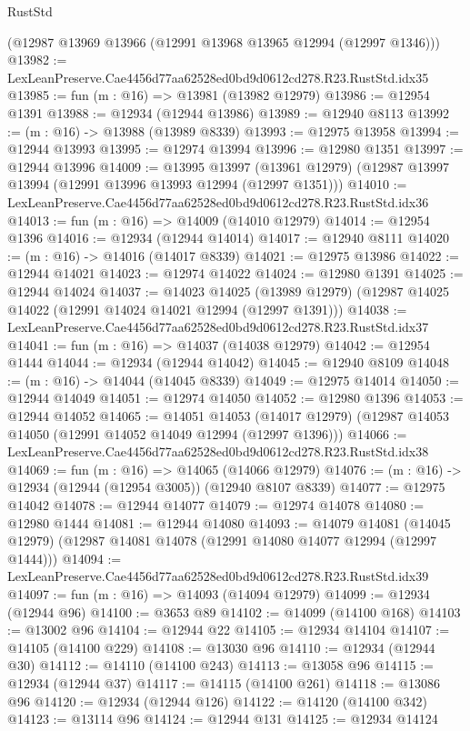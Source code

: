\begin{lexlean}{RustStd}
\begin{coremodule}
    (@12987 @13969 @13966 (@12991 @13968 @13965 @12994 (@12997 @1346)))
@13982 := LexLeanPreserve.Cae4456d77aa62528ed0bd9d0612cd278.R23.RustStd.idx35
@13985 := fun (m : @16) => @13981 (@13982 @12979)
@13986 := @12954 @1391
@13988 := @12934 (@12944 @13986)
@13989 := @12940 @8113
@13992 := (m : @16) -> @13988 (@13989 @8339)
@13993 := @12975 @13958
@13994 := @12944 @13993
@13995 := @12974 @13994
@13996 := @12980 @1351
@13997 := @12944 @13996
@14009 := @13995
    @13997
    (@13961 @12979)
    (@12987 @13997 @13994 (@12991 @13996 @13993 @12994 (@12997 @1351)))
@14010 := LexLeanPreserve.Cae4456d77aa62528ed0bd9d0612cd278.R23.RustStd.idx36
@14013 := fun (m : @16) => @14009 (@14010 @12979)
@14014 := @12954 @1396
@14016 := @12934 (@12944 @14014)
@14017 := @12940 @8111
@14020 := (m : @16) -> @14016 (@14017 @8339)
@14021 := @12975 @13986
@14022 := @12944 @14021
@14023 := @12974 @14022
@14024 := @12980 @1391
@14025 := @12944 @14024
@14037 := @14023
    @14025
    (@13989 @12979)
    (@12987 @14025 @14022 (@12991 @14024 @14021 @12994 (@12997 @1391)))
@14038 := LexLeanPreserve.Cae4456d77aa62528ed0bd9d0612cd278.R23.RustStd.idx37
@14041 := fun (m : @16) => @14037 (@14038 @12979)
@14042 := @12954 @1444
@14044 := @12934 (@12944 @14042)
@14045 := @12940 @8109
@14048 := (m : @16) -> @14044 (@14045 @8339)
@14049 := @12975 @14014
@14050 := @12944 @14049
@14051 := @12974 @14050
@14052 := @12980 @1396
@14053 := @12944 @14052
@14065 := @14051
    @14053
    (@14017 @12979)
    (@12987 @14053 @14050 (@12991 @14052 @14049 @12994 (@12997 @1396)))
@14066 := LexLeanPreserve.Cae4456d77aa62528ed0bd9d0612cd278.R23.RustStd.idx38
@14069 := fun (m : @16) => @14065 (@14066 @12979)
@14076 := (m : @16) -> @12934 (@12944 (@12954 @3005)) (@12940 @8107 @8339)
@14077 := @12975 @14042
@14078 := @12944 @14077
@14079 := @12974 @14078
@14080 := @12980 @1444
@14081 := @12944 @14080
@14093 := @14079
    @14081
    (@14045 @12979)
    (@12987 @14081 @14078 (@12991 @14080 @14077 @12994 (@12997 @1444)))
@14094 := LexLeanPreserve.Cae4456d77aa62528ed0bd9d0612cd278.R23.RustStd.idx39
@14097 := fun (m : @16) => @14093 (@14094 @12979)
@14099 := @12934 (@12944 @96)
@14100 := @3653 @89
@14102 := @14099 (@14100 @168)
@14103 := @13002 @96
@14104 := @12944 @22
@14105 := @12934 @14104
@14107 := @14105 (@14100 @229)
@14108 := @13030 @96
@14110 := @12934 (@12944 @30)
@14112 := @14110 (@14100 @243)
@14113 := @13058 @96
@14115 := @12934 (@12944 @37)
@14117 := @14115 (@14100 @261)
@14118 := @13086 @96
@14120 := @12934 (@12944 @126)
@14122 := @14120 (@14100 @342)
@14123 := @13114 @96
@14124 := @12944 @131
@14125 := @12934 @14124

\end{coremodule}
\end{lexlean}
